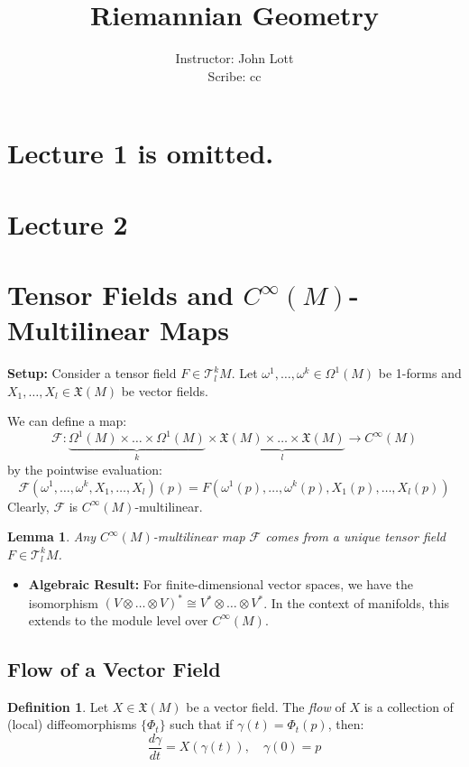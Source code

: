 \documentclass[11pt, a4paper]{article}
\title{Riemannian Geometry}
\author{Instructor: John Lott \\ Scribe: cc}
\date{}
\theoremstyle{plain}
\newtheorem{lemma}[theorem]{Lemma}
\theoremstyle{definition}
\newtheorem{definition}[theorem]{Definition}
\theoremstyle{remark}
\begin{document}
\maketitle

\tableofcontents
\newpage
\section{Lecture 1 is omitted.}
\section{Lecture 2}

\section*{Tensor Fields and $C^\infty(M)$-Multilinear Maps}

\textbf{Setup:} Consider a tensor field $F \in \mathcal{T}^k_l M$. Let $\omega^1, \dots, \omega^k \in \Omega^1(M)$ be 1-forms and $X_1, \dots, X_l \in \mathfrak{X}(M)$ be vector fields.

We can define a map:
\[
\mathcal{F}: \underbrace{\Omega^1(M) \times \dots \times \Omega^1(M)}_{k} \times \underbrace{\mathfrak{X}(M) \times \dots \times \mathfrak{X}(M)}_{l} \to C^\infty(M)
\]
by the pointwise evaluation:
\[
\mathcal{F}(\omega^1, \dots, \omega^k, X_1, \dots, X_l)(p) = F(\omega^1(p), \dots, \omega^k(p), X_1(p), \dots, X_l(p))
\]
Clearly, $\mathcal{F}$ is $C^\infty(M)$-multilinear.

\begin{lemma}
Any $C^\infty(M)$-multilinear map $\mathcal{F}$ comes from a unique tensor field $F \in \mathcal{T}^k_l M$.
\end{lemma}

\begin{itemize}
    \item \textbf{Algebraic Result:} For finite-dimensional vector spaces, we have the isomorphism $(V \otimes \dots \otimes V)^* \cong V^* \otimes \dots \otimes V^*$. In the context of manifolds, this extends to the module level over $C^\infty(M)$.
\end{itemize}

\subsection{Flow of a Vector Field}

\begin{definition}
Let $X \in \mathfrak{X}(M)$ be a vector field. The \emph{flow} of $X$ is a collection of (local) diffeomorphisms $\{\Phi_t\}$ such that if $\gamma(t) = \Phi_t(p)$, then:
\[
\frac{d\gamma}{dt} = X(\gamma(t)), \quad \gamma(0) = p
\]
\end{definition}
\end{document}
